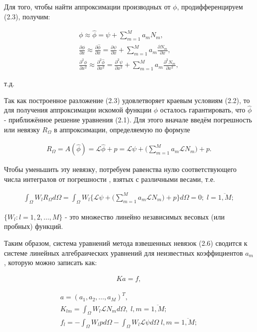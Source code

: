 \documentclass[14pt]{extreport}
\begin{document}
Для того, чтобы найти аппроксимации производных от $\phi$, продифференцируем (2.3), получим:


\begin{gather}
\phi \approx \hat\phi = \psi + \sum\limits_{m=1}^{M} a_mN_m,\nonumber\\
\frac{\partial \phi}{\partial x} \approx \frac{\partial \hat\phi}{\partial x}=\frac{\partial \psi}{\partial x}+\sum\limits_{m=1}^{M} a_m\frac{\partial N_m}{\partial x},\nonumber\\
\frac{\partial^2 \phi}{\partial x^2} \approx \frac{\partial^2 \hat\phi}{\partial x^2}=\frac{\partial^2 \psi}{\partial x^2}+\sum\limits_{m=1}^{M} a_m\frac{\partial^2 N_m}{\partial x^2}, \nonumber
\end{gather}

 т.д.

Так как построенное разложение (2.3) удовлетворяет краевым условиям (2.2), то для получения аппроксимации искомой функции $\phi$ осталось гарантировать, что $\hat\phi$ - приближённое решение уравнения (2.1). Для этого вначале введём погрешность или невязку $R_\Omega$ в аппроксимации, определяемую по формуле


\begin{eqnarray}
R_\Omega=A(\hat\phi)=\mathcal L \hat\phi+p=\mathcal L\psi+\bigg(\sum\limits_{m=1}^{M} a_m \mathcal L N_m\bigg) +p.
\end{eqnarray}

Чтобы уменьшить эту невязку, потребуем равенства нулю соответствующего числа интегралов от погрешности \cite{Zorich:2002:CALC}, взятых с различными весами, т.е.

\begin{eqnarray}
\int_\Omega W_l R_\Omega d\Omega = \int_\Omega W_l \bigg\{\mathcal L \psi +\bigg(\sum\limits_{m=1}^{M} a_m \mathcal L N_m\bigg) +p \bigg\} d\Omega =0; \; l=\overline{1,M};
\end{eqnarray}

 $\{W_l:l=1,2,\dots,M\}$ - это множество линейно независимых весовых (или пробных) функций.

Таким образом, система уравнений метода взвешенных невязок (2.6) сводится к системе линейных алгебраических уравнений для неизвестных коэффициентов $a_m$, которую можно записать как:

\begin{eqnarray}
Ka=f,
\end{eqnarray}


\begin{gather}
a = (a_1,a_2,\dots, a_M)^T, \\
K_{lm}=\int_\Omega W_l \mathcal L N_m  d\Omega, \; l,m=\overline{1,M}; \\
f_l=-\int_\Omega W_l p d \Omega-\int_\Omega W_l \mathcal L \psi d \Omega \; l,m=\overline{1,M};
\end{gather}
\end{document}
